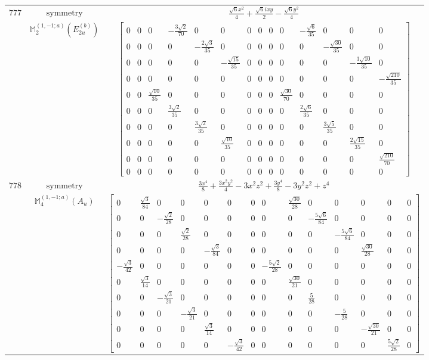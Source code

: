 \documentclass[fleqn,8pt,landscape]{jsarticle}
\begin{document}
\begin{longtable}{ccc}
$ 777 $ & $ \text{symmetry} $ & $ \frac{\sqrt{6} x^{2}}{4} + \frac{\sqrt{6} i x y}{2} - \frac{\sqrt{6} y^{2}}{4} $ \\
$  $ & $ \mathbb{M}_{2}^{(1,-1;a)}(E_{2u}^{(b)}) $ & $ \begin{bmatrix} 0 & 0 & 0 & - \frac{3 \sqrt{2}}{70} & 0 & 0 & 0 & 0 & 0 & 0 & - \frac{\sqrt{6}}{35} & 0 & 0 & 0 \\ 0 & 0 & 0 & 0 & - \frac{2 \sqrt{3}}{35} & 0 & 0 & 0 & 0 & 0 & 0 & - \frac{\sqrt{30}}{35} & 0 & 0 \\ 0 & 0 & 0 & 0 & 0 & - \frac{\sqrt{15}}{35} & 0 & 0 & 0 & 0 & 0 & 0 & - \frac{3 \sqrt{10}}{35} & 0 \\ 0 & 0 & 0 & 0 & 0 & 0 & 0 & 0 & 0 & 0 & 0 & 0 & 0 & - \frac{\sqrt{210}}{35} \\ 0 & 0 & \frac{\sqrt{10}}{35} & 0 & 0 & 0 & 0 & 0 & 0 & \frac{\sqrt{30}}{70} & 0 & 0 & 0 & 0 \\ 0 & 0 & 0 & \frac{3 \sqrt{2}}{35} & 0 & 0 & 0 & 0 & 0 & 0 & \frac{2 \sqrt{6}}{35} & 0 & 0 & 0 \\ 0 & 0 & 0 & 0 & \frac{3 \sqrt{2}}{35} & 0 & 0 & 0 & 0 & 0 & 0 & \frac{3 \sqrt{5}}{35} & 0 & 0 \\ 0 & 0 & 0 & 0 & 0 & \frac{\sqrt{10}}{35} & 0 & 0 & 0 & 0 & 0 & 0 & \frac{2 \sqrt{15}}{35} & 0 \\ 0 & 0 & 0 & 0 & 0 & 0 & 0 & 0 & 0 & 0 & 0 & 0 & 0 & \frac{\sqrt{210}}{70} \\ 0 & 0 & 0 & 0 & 0 & 0 & 0 & 0 & 0 & 0 & 0 & 0 & 0 & 0 \end{bmatrix} $ \\ \hline
$ 778 $ & $ \text{symmetry} $ & $ \frac{3 x^{4}}{8} + \frac{3 x^{2} y^{2}}{4} - 3 x^{2} z^{2} + \frac{3 y^{4}}{8} - 3 y^{2} z^{2} + z^{4} $ \\
$  $ & $ \mathbb{M}_{4}^{(1,-1;a)}(A_{u}) $ & $ \begin{bmatrix} 0 & \frac{\sqrt{3}}{84} & 0 & 0 & 0 & 0 & 0 & 0 & \frac{\sqrt{30}}{28} & 0 & 0 & 0 & 0 & 0 \\ 0 & 0 & - \frac{\sqrt{2}}{28} & 0 & 0 & 0 & 0 & 0 & 0 & - \frac{5 \sqrt{6}}{84} & 0 & 0 & 0 & 0 \\ 0 & 0 & 0 & \frac{\sqrt{2}}{28} & 0 & 0 & 0 & 0 & 0 & 0 & - \frac{5 \sqrt{6}}{84} & 0 & 0 & 0 \\ 0 & 0 & 0 & 0 & - \frac{\sqrt{3}}{84} & 0 & 0 & 0 & 0 & 0 & 0 & \frac{\sqrt{30}}{28} & 0 & 0 \\ - \frac{\sqrt{3}}{42} & 0 & 0 & 0 & 0 & 0 & 0 & - \frac{5 \sqrt{2}}{28} & 0 & 0 & 0 & 0 & 0 & 0 \\ 0 & \frac{\sqrt{3}}{14} & 0 & 0 & 0 & 0 & 0 & 0 & \frac{\sqrt{30}}{21} & 0 & 0 & 0 & 0 & 0 \\ 0 & 0 & - \frac{\sqrt{3}}{21} & 0 & 0 & 0 & 0 & 0 & 0 & \frac{5}{28} & 0 & 0 & 0 & 0 \\ 0 & 0 & 0 & - \frac{\sqrt{3}}{21} & 0 & 0 & 0 & 0 & 0 & 0 & - \frac{5}{28} & 0 & 0 & 0 \\ 0 & 0 & 0 & 0 & \frac{\sqrt{3}}{14} & 0 & 0 & 0 & 0 & 0 & 0 & - \frac{\sqrt{30}}{21} & 0 & 0 \\ 0 & 0 & 0 & 0 & 0 & - \frac{\sqrt{3}}{42} & 0 & 0 & 0 & 0 & 0 & 0 & \frac{5 \sqrt{2}}{28} & 0 \end{bmatrix} $ \\ \hline

\end{longtable}
\end{document}
